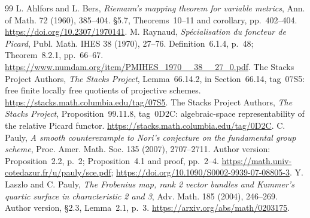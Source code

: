 \documentclass[11pt,a4paper]{article}
\theoremstyle{definition}
\begin{document}
\begin{thebibliography}{99}
 L. Ahlfors and L. Bers, \emph{Riemann's mapping theorem for variable metrics}, Ann. of Math. 72 (1960), 385--404. \S5.7, Theorems~10--11 and corollary, pp.~402--404. \url{https://doi.org/10.2307/1970141}.
 M. Raynaud, \emph{Sp\'ecialisation du foncteur de Picard}, Publ. Math. IHES 38 (1970), 27--76. Definition~6.1.4, p.~48; Theorem~8.2.1, pp.~66--67. \url{https://www.numdam.org/item/PMIHES_1970__38__27_0.pdf}.
 The Stacks Project Authors, \emph{The Stacks Project}, Lemma~66.14.2, in Section~66.14, tag~07S5: free finite locally free quotients of projective schemes. \url{https://stacks.math.columbia.edu/tag/07S5}.
 The Stacks Project Authors, \emph{The Stacks Project}, Proposition~99.11.8, tag~0D2C: algebraic-space representability of the relative Picard functor. \url{https://stacks.math.columbia.edu/tag/0D2C}.
 C. Pauly, \emph{A smooth counterexample to Nori's conjecture on the fundamental group scheme}, Proc. Amer. Math. Soc. 135 (2007), 2707--2711. Author version: Proposition~2.2, p.~2; Proposition~4.1 and proof, pp.~2--4. \url{https://math.univ-cotedazur.fr/u/pauly/sce.pdf}; \url{https://doi.org/10.1090/S0002-9939-07-08805-3}.
 Y. Laszlo and C. Pauly, \emph{The Frobenius map, rank 2 vector bundles and Kummer's quartic surface in characteristic 2 and 3}, Adv. Math. 185 (2004), 246--269. Author version, \S2.3, Lemma~2.1, p.~3. \url{https://arxiv.org/abs/math/0203175}.

\end{thebibliography}
\end{document}
